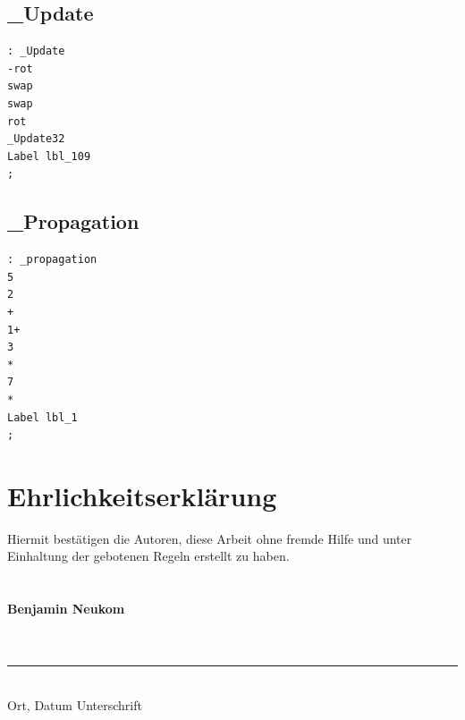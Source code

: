 \documentclass[listof=totocnumbered,bibliography=totocnumbered]{scrreprt}
\numberwithin{equation}{subsection}
\begin{document}
\section{\_Update}
\begin{verbatim}
: _Update
-rot
swap
swap
rot
_Update32
Label lbl_109
;
\end{verbatim}
\newpage
\section{\_Propagation}
\begin{verbatim}
: _propagation
5
2
+
1+
3
*
7
*
Label lbl_1
;
\end{verbatim}

\newpage
\chapter{Ehrlichkeitserklärung}
Hiermit bestätigen die Autoren, diese Arbeit ohne fremde Hilfe und unter Einhaltung der gebotenen Regeln erstellt zu haben.
\\
\\
\\
\textbf{Benjamin Neukom}
\\
\\
\\
\rule{0.75\textwidth}{0.4pt} \\
Ort, Datum \hspace * {4cm} Unterschrift
\end{document}
